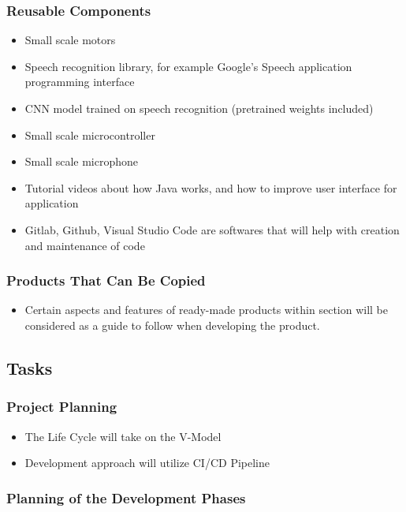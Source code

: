 \documentclass[12pt]{article}
\begin{document}
\subsubsection{Reusable Components}
\begin{itemize}
  \item Small scale motors
  \item Speech recognition library, for example Google's Speech application programming interface
  \item CNN model trained on speech recognition (pretrained weights included) 
  \item Small scale microcontroller
  \item Small scale microphone
  \item Tutorial videos about how Java works, and how to improve user interface for application
  \item Gitlab, Github, Visual Studio Code are softwares that will help with creation and maintenance of code
\end{itemize}
\subsubsection{Products That Can Be Copied}
\begin{itemize}
  \item Certain aspects and features of ready-made products within section  will be considered as a guide to follow when developing the product.
\end{itemize}
\subsection{Tasks}

\subsubsection{Project Planning}

\begin{itemize}
  \item The Life Cycle will take on the V-Model
  \item Development approach will utilize CI/CD Pipeline
\end{itemize}

\subsubsection{Planning of the Development Phases}
\end{document}
